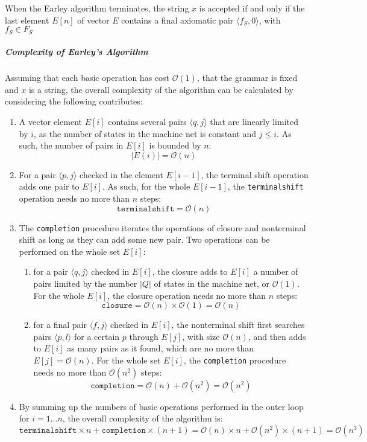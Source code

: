 \documentclass[english]{article}
\begin{document}
\begin{property}
  When the Earley algorithm terminates, the string \(x\) is accepted if and only if the last element \(E[n]\) of vector \(E\) contains a final axiomatic pair \(\langle f_S, 0 \rangle\), with \(f_S \in F_S\)
\end{property}

\subparagraph*{Complexity of Earley's Algorithm}
Assuming that each basic operation has cost \(\mathcal{O}(1)\), that the grammar is fixed and \(x\) is a string, the overall complexity of the algorithm can be calculated by considering the following contributes:

\begin{enumerate}
  \item A vector element \(E[i]\) contains several pairs \(\langle q, j \rangle\) that are linearly limited by \(i\), as the number of states in the machine net is constant and \(j \leq i\). As such, the number of pairs in \(E[i]\) is bounded by \(n\): \[ |E(i)| = \mathcal{O}(n) \]
  \item For a pair \(\langle p, j \rangle\) checked in the element \(E[i-1]\), the terminal shift operation adds one pair to \(E[i]\). As such, for the whole \(E[i-1]\), the \texttt{terminalshift} operation needs no more than \(n\) steps: \[ \texttt{terminalshift} = \mathcal{O}(n) \]
  \item The \texttt{completion} procedure iterates the operations of closure and nonterminal shift as long as they can add some new pair. Two operations can be performed on the whole set \(E[i]\):
        \begin{enumerate}
          \item for a pair \(\langle q, j\rangle\) checked in \(E[i]\), the closure adds to \(E[i]\) a number of pairs limited by the number \(|Q|\) of states in the machine net, or \(\mathcal{O}(1)\). For the whole \(E[i]\), the closure operation needs no more than \(n\) steps: \[ \texttt{closure} = \mathcal{O}(n) \times \mathcal{O}(1) = \mathcal{O}(n) \]
          \item for a final pair \(\langle f, j \rangle\) checked in \(E[i]\), the nonterminal shift first searches pairs \(\langle p, l\rangle\) for a certain \(p\) through \(E[j]\), with size \(\mathcal{O}(n)\), and then adds to \(E[i]\) as many pairs as it found, which are no more than \(E[j] = \mathcal{O}(n)\). For the whole set \(E[i]\), the \texttt{completion} procedure needs no more than \(\mathcal{O}(n^2)\) steps: \[ \texttt{completion} = \mathcal{O}(n) + \mathcal{O}(n^2) = \mathcal{O}(n^2) \]
        \end{enumerate}
  \item By summing up the numbers of basic operations performed in the outer loop for \(i = 1 \dots n\), the overall complexity of the algorithm is: \[ \texttt{terminalshift} \times n + \texttt{completion} \times (n+1) = \mathcal{O}(n) \times n + \mathcal{O}(n^2) \times (n + 1) = \mathcal{O}(n^3) \]
\end{enumerate}
\end{document}
